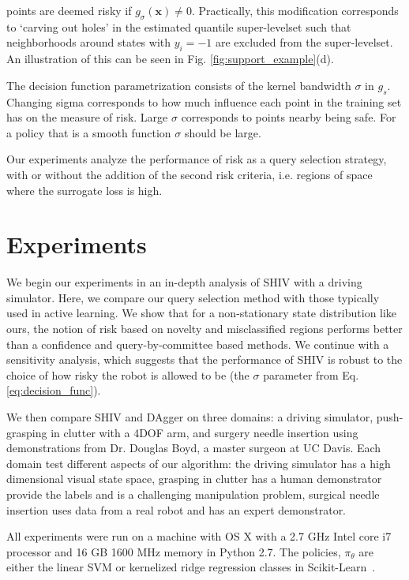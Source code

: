 \documentclass[10pt, conference]{ieeeconf}      %
\newcommand{\bx}{\mathbf{x}}
\begin{document}
points are deemed risky if $g_{\sigma}(\bx) \neq 0$.  Practically, this modification corresponds to
`carving out holes' in the estimated quantile super-levelset such that neighborhoods around states with $y_i=-1$ are
excluded from the super-levelset. An illustration of this can be seen in Fig. \ref{fig:support_example}(d).

The decision function parametrization consists of the kernel bandwidth $\sigma$ in $g_s$. Changing sigma corresponds to how much influence each point in the training set has on the measure of risk. Large $\sigma$ corresponds to points nearby being safe. For a policy that is a smooth function $\sigma$ should be large. 

Our experiments analyze the performance of risk as a query selection strategy, with or without the addition of the second risk criteria, i.e. regions of space where the surrogate loss is high.



\section{Experiments}

We begin our experiments in an in-depth analysis of SHIV with a driving simulator. Here, we compare our query selection method with those typically used in active learning. We show that for a non-stationary state distribution like ours, the notion of risk based on novelty and misclassified regions performs better than a confidence and query-by-committee based methods. We continue with a sensitivity analysis, which suggests that the performance of SHIV is robust to the choice of how risky the robot is allowed to be (the $\sigma$ parameter from Eq. \ref{eq:decision_func}).

We then compare SHIV and DAgger on three domains: a driving simulator, push-grasping in clutter with a 4DOF arm, and surgery needle insertion using demonstrations from Dr. Douglas Boyd, a master surgeon at UC Davis. Each domain test different aspects of our algorithm: the driving simulator has a high dimensional visual state space, grasping in clutter has a human demonstrator provide the labels and is a challenging manipulation problem, surgical needle insertion uses data from a real robot and has an expert demonstrator. 

All experiments were run on a machine with OS X with a 2.7 GHz Intel core i7 processor and 16 GB
1600 MHz memory in Python 2.7. The policies, $\pi_\theta$ are either the linear SVM or  kernelized ridge regression classes in Scikit-Learn~\cite{scikit-learn}.
\end{document}
